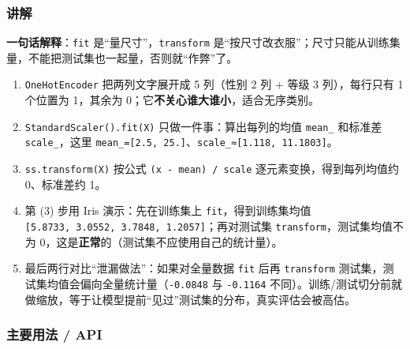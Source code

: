 \subsubsection{讲解}\label{ux8bb2ux89e3-29}

\textbf{一句话解释}：\texttt{fit} 是``量尺寸''，\texttt{transform}
是``按尺寸改衣服''；尺寸只能从训练集量，不能把测试集也一起量，否则就``作弊''了。

\begin{enumerate}
\def\labelenumi{\arabic{enumi}.}
\tightlist
\item
  \texttt{OneHotEncoder} 把两列文字展开成 5 列（性别 2 列 + 等级 3
  列），每行只有 1 个位置为 1，其余为
  0；它\textbf{不关心谁大谁小}，适合无序类别。
\item
  \texttt{StandardScaler().fit(X)} 只做一件事：算出每列的均值
  \texttt{mean\_} 和标准差 \texttt{scale\_}，这里
  \texttt{mean\_={[}2.5,\ 25.{]}}、\texttt{scale\_≈{[}1.118,\ 11.1803{]}}。
\item
  \texttt{ss.transform(X)} 按公式 \texttt{(x\ -\ mean)\ /\ scale}
  逐元素变换，得到每列均值约 0、标准差约 1。
\item
  第 (3) 步用 Iris 演示：先在训练集上 \texttt{fit}，得到训练集均值
  \texttt{{[}5.8733,\ 3.0552,\ 3.7848,\ 1.2057{]}}；再对测试集
  \texttt{transform}，测试集均值不为
  0，这是\textbf{正常}的（测试集不应使用自己的统计量）。
\item
  最后两行对比``泄漏做法''：如果对全量数据 \texttt{fit} 后再
  \texttt{transform}
  测试集，测试集均值会偏向全量统计量（\texttt{-0.0848} 与
  \texttt{-0.1164}
  不同）。训练/测试切分前就做缩放，等于让模型提前``见过''测试集的分布，真实评估会被高估。
\end{enumerate}

\subsubsection{主要用法 / API}\label{ux4e3bux8981ux7528ux6cd5-api-31}


